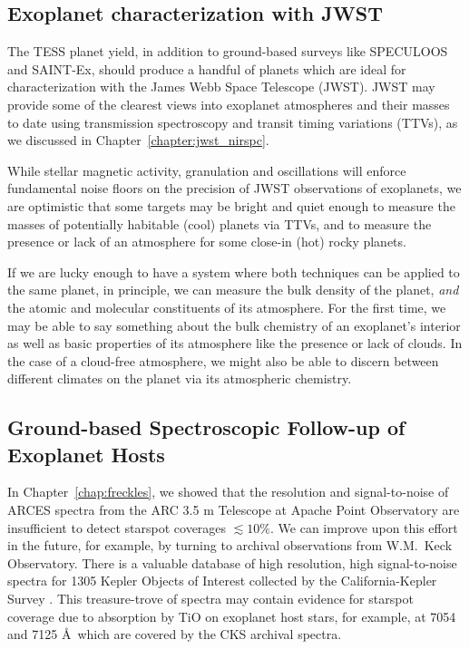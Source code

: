 \subsection{Exoplanet characterization with JWST}

The TESS planet yield, in addition to ground-based surveys like SPECULOOS \citep{Delrez2018b} and SAINT-Ex, should produce a handful of planets which are ideal for characterization with the James Webb Space Telescope (JWST). JWST may provide some of the clearest views into exoplanet atmospheres and their masses to date using transmission spectroscopy and transit timing variations (TTVs), as we discussed in Chapter~\ref{chapter:jwst_nirspc}. 

While stellar magnetic activity, granulation and oscillations will enforce fundamental noise floors on the precision of JWST observations of exoplanets, we are optimistic that some targets may be bright and quiet enough to measure the masses of potentially habitable (cool) planets via TTVs, and to measure the presence or lack of an atmosphere for some close-in (hot) rocky planets. 

If we are lucky enough to have a system where both techniques can be applied to the same planet, in principle, we can measure the bulk density of the planet, {\it and} the atomic and molecular constituents of its atmosphere. For the first time, we may be able to say something about the bulk chemistry of an exoplanet's interior as well as basic properties of its atmosphere like the presence or lack of clouds. In the case of a cloud-free atmosphere, we might also be able to discern between different climates on the planet via its atmospheric chemistry. 

\subsection{Ground-based Spectroscopic Follow-up of Exoplanet Hosts}

In Chapter~\ref{chap:freckles}, we showed that the resolution and signal-to-noise of ARCES spectra from the ARC 3.5 m Telescope at Apache Point Observatory are insufficient to detect starspot coverages $\lesssim10\%$. We can improve upon this effort in the future, for example, by turning to archival observations from W.M.~Keck Observatory. There is a valuable database of high resolution, high signal-to-noise spectra for 1305 Kepler Objects of Interest collected by the California-Kepler Survey \citep[CKS:][]{Petigura2017,Johnson2017}. This treasure-trove of spectra may contain evidence for starspot coverage due to absorption by TiO on exoplanet host stars, for example, at 7054 and 7125 \AA\ which are covered by the CKS archival spectra. 

